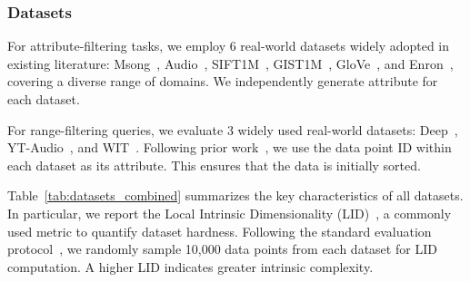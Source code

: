 \documentclass[sigconf, nonacm]{acmart}
\begin{document}
\subsubsection{Datasets}

For attribute-filtering tasks, we employ 6 real-world datasets widely adopted in existing literature: Msong~\cite{msong2011}, Audio~\cite{audio_unknown}, SIFT1M~\cite{sift2010}, GIST1M~\cite{sift2010}, GloVe~\cite{GloVe2015}, and Enron~\cite{enron2015}, covering a diverse range of domains. We independently generate attribute for each dataset.


For range-filtering queries, we evaluate 3 widely used real-world datasets: Deep~\cite{yandex_deep_dataset}, YT-Audio~\cite{youtube8m_dataset}, and WIT~\cite{wit_dataset}. Following prior work~\cite{DSG}, we use the data point ID within each dataset as its attribute. This ensures that the data is initially sorted.

Table~\ref{tab:datasets_combined} summarizes the key characteristics of all datasets. In particular, we report the Local Intrinsic Dimensionality (LID)~\cite{Lid}, a commonly used metric to quantify dataset hardness. Following the standard evaluation protocol~\cite{LID2}, we randomly sample 10,000 data points from each dataset for LID computation. A higher LID indicates greater intrinsic complexity.

\setlength{\textfloatsep}{0.1cm}
\setlength{\floatsep}{0cm}
\begin{table}[t]
\centering
\setlength{\abovecaptionskip}{0.05cm}
\setlength{\textfloatsep}{0.cm}
\caption{Datassets}

\label{tab:datasets_combined}
\end{table}
\end{document}
